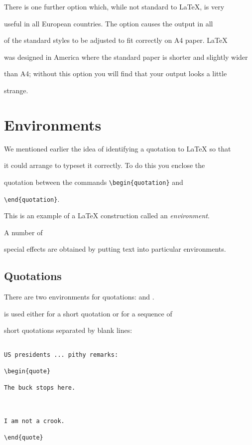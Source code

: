 There is one further option which, while not standard to \LaTeX{}, is very

useful in all European countries. The  option causes the output in all

of the standard styles to be adjusted to fit correctly on A4 paper.  \LaTeX{}

was designed in America where the standard paper is shorter and slightly wider

than A4; without this option you will find that your output looks a little

strange.



\section{Environments}



We mentioned earlier the idea of identifying a quotation to \LaTeX{} so that

it could arrange to typeset it correctly. To do this you enclose the

quotation between the commands \verb|\begin{quotation}| and

\verb|\end{quotation}|.

This is an example of a \LaTeX{} construction called an {\em environment\/}.

A number of

special effects are obtained by putting text into particular environments.



\subsection{Quotations}



There are two environments for quotations:  and .

 is used either for a short quotation or for a sequence of

short quotations separated by blank lines:

\egstart

\begin{verbatim}

US presidents ... pithy remarks:

\begin{quote}

The buck stops here.



I am not a crook.

\end{quote}

\end{verbatim}

